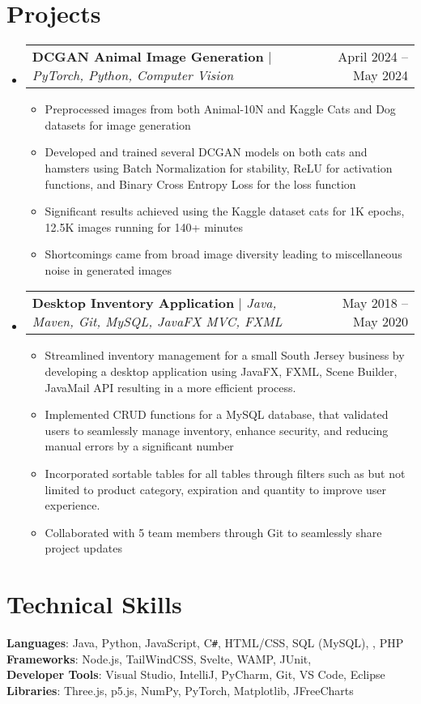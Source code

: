 \documentclass[letterpaper,11pt]{article}
\makeatletter
\newcommand{\resumeItem}[1]{
  \item\small{
    {#1 \vspace{-2pt}}
  }
}
\newcommand{\resumeProjectHeading}[2]{
    \item
    \begin{tabular*}{0.97\textwidth}{l@{\extracolsep{\fill}}r}
      \small#1 & #2 \\
    \end{tabular*}\vspace{-7pt}
}
\newcommand{\resumeSubHeadingListStart}{\begin{itemize}[leftmargin=0.15in, label={}]}
\newcommand{\resumeSubHeadingListEnd}{\end{itemize}}
\newcommand{\resumeItemListStart}{\begin{itemize}}
\newcommand{\resumeItemListEnd}{\end{itemize}\vspace{-5pt}}
\makeatother
\begin{document}
\section{Projects}
    \resumeSubHeadingListStart
      \resumeProjectHeading
          {\textbf{DCGAN Animal Image Generation} $|$ \emph{PyTorch, Python, Computer Vision}}{April 2024 -- May 2024}
          \resumeItemListStart
            \resumeItem{Preprocessed images from both Animal-10N and Kaggle Cats and Dog datasets for image generation}
            \resumeItem{Developed and trained several DCGAN models on both cats and hamsters using Batch Normalization for stability, ReLU for activation functions, and Binary Cross Entropy Loss for the loss function }
            \resumeItem{Significant results achieved using the Kaggle dataset cats for 1K epochs, 12.5K images running for 140+ minutes}
            \resumeItem{Shortcomings came from broad image diversity leading to miscellaneous noise in generated images}
          \resumeItemListEnd
      \resumeProjectHeading
          {\textbf{Desktop Inventory Application} $|$ \emph{Java, Maven, Git, MySQL, JavaFX MVC, FXML}}{May 2018 -- May 2020}
          \resumeItemListStart
            \resumeItem{Streamlined inventory management for a small South Jersey business by developing a 
            desktop application using JavaFX, FXML, Scene Builder, JavaMail API resulting in a more efficient process.}
            \resumeItem{Implemented CRUD functions for a MySQL database, that validated users to seamlessly manage inventory,
            enhance security, and reducing manual errors by a significant number}
            \resumeItem{Incorporated sortable tables for all tables through filters such as but not limited to product category, 
            expiration and quantity to improve user experience.}
            \resumeItem{Collaborated with 5 team members through Git to seamlessly share project updates}
          \resumeItemListEnd
    \resumeSubHeadingListEnd



%
\section{Technical Skills}
 \begin{itemize}[leftmargin=0.15in, label={}]
    \small{\item{
     \textbf{Languages}{: Java, Python, JavaScript, C\texttt{\#}, HTML/CSS, SQL (MySQL), , PHP } \\
     \textbf{Frameworks}{: Node.js, TailWindCSS, Svelte, WAMP, JUnit, } \\
     \textbf{Developer Tools}{: Visual Studio, IntelliJ, PyCharm, Git, VS Code, Eclipse} \\
     \textbf{Libraries}{: Three.js, p5.js, NumPy,  PyTorch, Matplotlib, JFreeCharts}
    }}
 \end{itemize}


\end{document}
